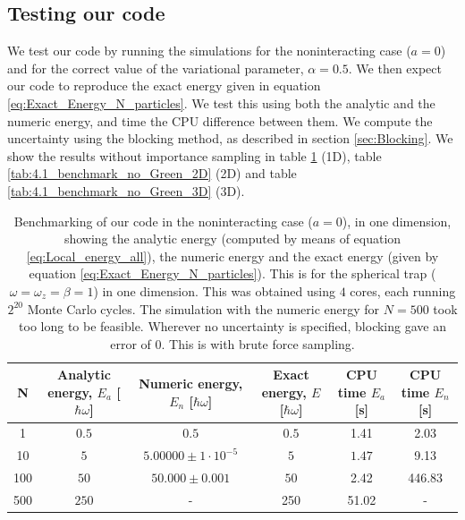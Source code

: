 \documentclass[a4paper, 10pt]{article}
\begin{document}
	\subsection{Testing our code}
	We test our code by running the simulations for the noninteracting case ($a=0$) and for the correct value of the variational parameter, $\alpha=0.5$. We then expect our code to reproduce the exact energy given in equation \ref{eq:Exact_Energy_N_particles}. We test this using both the analytic and the numeric energy, and time the CPU difference between them.  We compute the uncertainty using the blocking method, as described in section \ref{sec:Blocking}. We show the results without importance sampling in table \ref{tab:4.1_benchmark_no_Green} (1D), table \ref{tab:4.1_benchmark_no_Green_2D} (2D)  and table \ref{tab:4.1_benchmark_no_Green_3D} (3D).\\
	\begin{table}[ht!]
		\caption{Benchmarking of our code in the noninteracting case ($a=0$), in one dimension, showing the analytic energy (computed by means of equation \ref{eq:Local_energy_all}), the numeric energy and the exact energy (given by equation \ref{eq:Exact_Energy_N_particles}). This is for the spherical trap ($\omega=\omega_z=\beta=1$) in one dimension. This was obtained using $4$ cores, each running $2^{20}$ Monte Carlo cycles. The simulation with the numeric energy for $N=500$ took too long to be feasible. Wherever no uncertainty is specified, blocking gave an error of $0$. This is with brute force sampling.}\label{tab:4.1_benchmark_no_Green}
		\begin{adjustwidth}{-2cm}{}
			\begin{tabular}{cccccc}
				N & Analytic energy, $E_a$ [$\hbar \omega$] & Numeric energy, $E_n$ [$\hbar \omega$] & Exact energy, $E$ [$\hbar \omega$]& CPU time $E_a$ [s] &CPU time $E_n$ [s]\\
				\hline
				1&$0.5$&$0.5$&$0.5$& 1.41&2.03\\
				10&$5$&$5.00000\pm 1\cdot 10^{-5}$&$5$& $1.47$&9.13\\
				100&$50$&$50.000\pm 0.001$&$50$&2.42&446.83\\
				500&$250$&-&250 &51.02 &-
			\end{tabular}
		\end{adjustwidth}
	\end{table}
\end{document}
